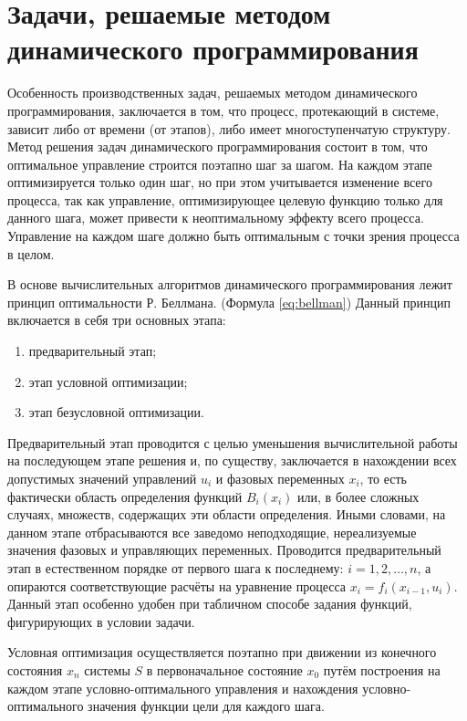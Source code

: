 \setlength{\abovedisplayskip}{1.5mm}
\setlength{\belowdisplayskip}{1.5mm}


\section{Задачи, решаемые методом динамического программирования}

\indent Особенность производственных задач, решаемых методом динамического программирования, заключается в том, что процесс, протекающий в системе, зависит либо от времени (от этапов), либо имеет многоступенчатую структуру. Метод решения задач динамического программирования состоит в том, что оптимальное управление строится поэтапно шаг за шагом. На каждом этапе оптимизируется только один шаг, но при этом учитывается изменение всего процесса, так как управление, оптимизирующее целевую функцию только для данного шага, может привести к неоптимальному эффекту всего процесса. Управление на каждом шаге должно быть оптимальным с точки зрения процесса в целом.

В основе вычислительных алгоритмов динамического программирования лежит принцип оптимальности Р. Беллмана. (Формула \ref{eq:bellman}) Данный принцип включается в себя три основных этапа:
\begin{enumerate}
    \item предварительный этап;
    \item этап условной оптимизации;
    \item этап безусловной оптимизации.
\end{enumerate}

Предварительный этап проводится с целью уменьшения вычислительной работы на последующем этапе решения и, по существу, заключается в нахождении всех допустимых значений управлений $u_i$ и фазовых переменных $x_i$, то есть фактически область определения функций $B_i(x_i)$ или, в более сложных случаях, множеств, содержащих эти области определения. Иными словами, на данном этапе отбрасываются все заведомо неподходящие, нереализуемые значения фазовых и управляющих переменных. Проводится предварительный этап в естественном порядке от первого шага к последнему: $i = 1, 2, \hdots, n$, а опираются соответствующие расчёты на уравнение процесса $x_i = f_i(x_{i−1},u_i)$. Данный этап особенно удобен при табличном способе задания функций, фигурирующих в условии задачи.

Условная оптимизация осуществляется поэтапно при движении из конечного состояния $x_n$ системы $S$ в первоначальное состояние $x_0$ путём построения на каждом этапе условно-оптимального управления и нахождения условно-оптимального значения функции цели для каждого шага.

